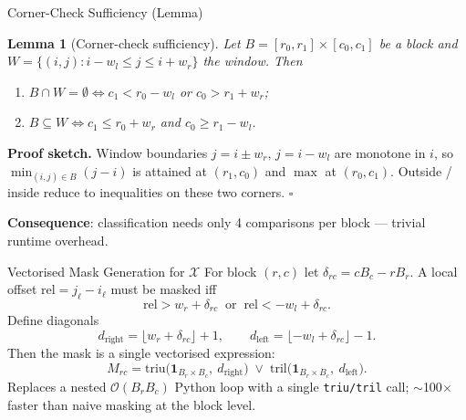 \documentclass[10pt,aspectratio=169]{beamer}
\newtheorem{lem}{Lemma}
\begin{document}
\begin{frame}{Corner-Check Sufficiency (Lemma)}
  \begin{lem}[Corner-check sufficiency]
  Let $B = [r_0,r_1] \times [c_0, c_1]$ be a block and
  $W = \{(i,j) : i - w_l \le j \le i + w_r\}$ the window. Then
  \begin{enumerate}
    \item[\textup{(i)}]
      $B \cap W = \emptyset \iff c_1 < r_0 - w_l$ \emph{or}
                              $c_0 > r_1 + w_r$;
    \item[\textup{(ii)}]
      $B \subseteq W \iff c_1 \le r_0 + w_r$ \emph{and}
                              $c_0 \ge r_1 - w_l$.
  \end{enumerate}
  \end{lem}
  \textbf{Proof sketch.} Window boundaries $j = i \pm w_r,\, j = i - w_l$ are
  monotone in $i$, so $\min_{(i,j)\in B}(j-i)$ is attained at
  $(r_1, c_0)$ and $\max$ at $(r_0, c_1)$. Outside / inside reduce to
  inequalities on these two corners. $\square$
  \vspace{1ex}

  \textbf{Consequence}: classification needs only \alert{4
  comparisons per block} — trivial runtime overhead.
\end{frame}

\begin{frame}{Vectorised Mask Generation for $\mathcal{X}$}
  For block $(r,c)$ let $\delta_{rc} = cB_c - rB_r$. A local offset
  $\text{rel} = j_\ell - i_\ell$ must be masked iff
  \[
    \text{rel} > w_r + \delta_{rc}
    \;\; \text{or}\;\;
    \text{rel} < -w_l + \delta_{rc}.
  \]
  Define diagonals
  \[
    d_{\text{right}} = \lfloor w_r + \delta_{rc}\rfloor + 1,\qquad
    d_{\text{left}}  = \lfloor -w_l + \delta_{rc}\rfloor - 1.
  \]
  Then the mask is a single vectorised expression:
  \[
    M_{rc} =
     \mathrm{triu}\bigl(\mathbf{1}_{B_r \times B_c},\ d_{\text{right}}\bigr)
     \;\lor\;
     \mathrm{tril}\bigl(\mathbf{1}_{B_r \times B_c},\ d_{\text{left}}\bigr).
  \]
  Replaces a nested $\mathcal{O}(B_r B_c)$ Python loop with a single
  \texttt{triu/tril} call; \alert{$\sim$100$\times$} faster than naive
  masking at the block level.
\end{frame}
\end{document}
